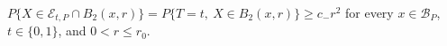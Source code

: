 \(P\{X\in\mathcal E_{t,P}\cap B_2(x,r)\}=P\{T=t,\ X\in B_2(x,r)\}\geq c_{-}r^2\) for every \(x\in\mathcal B_P\), \(t\in\{0,1\}\), and \(0<r\leq r_0\).
